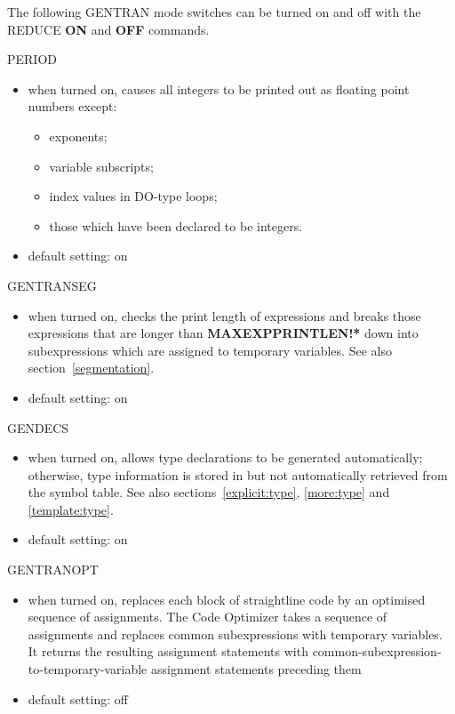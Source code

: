The following GENTRAN mode switches can be turned on and off with the
REDUCE {\bf ON} and {\bf OFF} commands.
\begin{describe}{PERIOD}
\begin{itemize}
\item when turned on, causes all integers to be printed out as floating point
numbers except:
\begin{itemize}
\item exponents;
\item variable subscripts;
\item index values in DO-type loops;
\item those which have been declared to be integers.
\end{itemize}
\item default setting:  on
\end{itemize}
\end{describe}
\begin{describe}{GENTRANSEG}
\begin{itemize}
\item when turned on, checks the print length of expressions and breaks
those expressions that are longer than {\bf MAXEXPPRINTLEN!*} down
into subexpressions which are assigned to temporary variables.
See also section~\ref{segmentation}.
\item default setting:  on
\end{itemize}
\end{describe}
\begin{describe}{GENDECS}
\begin{itemize}
\item when turned on, allows type declarations to be generated automatically;
otherwise, type information is stored in but not automatically retrieved
from the symbol table.  See also sections~\ref{explicit:type}, \ref{more:type}
and \ref{template:type}.
\item default setting:  on
\end{itemize}
\end{describe}
\begin{describe}{GENTRANOPT}
\begin{itemize}
\item when turned on, replaces each block of straightline code by
an optimised sequence of assignments.
The Code Optimizer takes a sequence of assignments and replaces common
subexpressions with temporary variables.  It returns the resulting assignment
statements with common-subexpression-to-temporary-variable assignment
statements preceding them
\item default setting:  off
\end{itemize} 
\end{describe} 
